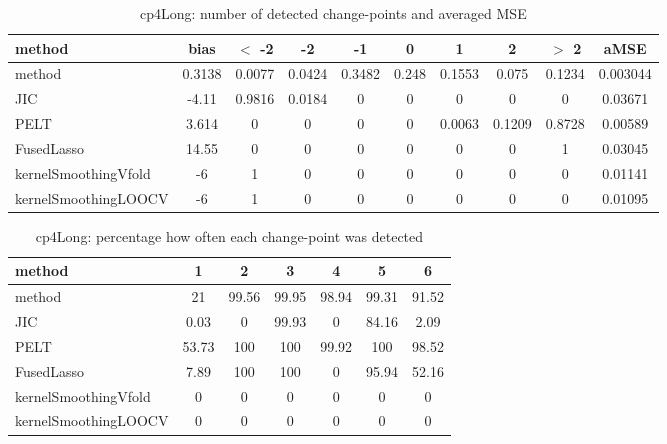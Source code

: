 \begin{table}[ht]
\centering
\begin{tabular}{l|c|ccccccc|c}
  \hline
method & bias & $<$ -2 & -2 & -1 & 0 & 1 & 2 & $>$ 2 & aMSE \\ 
  \hline
method & 0.3138 & 0.0077 & 0.0424 & 0.3482 & 0.248 & 0.1553 & 0.075 & 0.1234 & 0.003044 \\ 
  JIC & -4.11 & 0.9816 & 0.0184 &     0 &     0 &     0 &     0 &     0 & 0.03671 \\ 
  PELT & 3.614 &     0 &     0 &     0 &     0 & 0.0063 & 0.1209 & 0.8728 & 0.00589 \\ 
  FusedLasso & 14.55 &     0 &     0 &     0 &     0 &     0 &     0 &     1 & 0.03045 \\ 
  kernelSmoothingVfold &    -6 &     1 &     0 &     0 &     0 &     0 &     0 &     0 & 0.01141 \\ 
  kernelSmoothingLOOCV &    -6 &     1 &     0 &     0 &     0 &     0 &     0 &     0 & 0.01095 \\ 
   \hline
\end{tabular}
\caption{cp4Long: number of detected change-points and averaged MSE} 
\label{tab:cp4LongNjumps}
\end{table}
\begin{table}[ht]
\centering
\begin{tabular}{l|cccccc}
  \hline
method & 1 & 2 & 3 & 4 & 5 & 6 \\ 
  \hline
method &     21 &  99.56 &  99.95 &  98.94 &  99.31 &  91.52 \\ 
  JIC &   0.03 &      0 &  99.93 &      0 &  84.16 &   2.09 \\ 
  PELT &  53.73 &    100 &    100 &  99.92 &    100 &  98.52 \\ 
  FusedLasso &   7.89 &    100 &    100 &      0 &  95.94 &  52.16 \\ 
  kernelSmoothingVfold &      0 &      0 &      0 &      0 &      0 &      0 \\ 
  kernelSmoothingLOOCV &      0 &      0 &      0 &      0 &      0 &      0 \\ 
   \hline
\end{tabular}
\caption{cp4Long: percentage how often each change-point was detected} 
\label{tab:cp4LongDetections}
\end{table}
